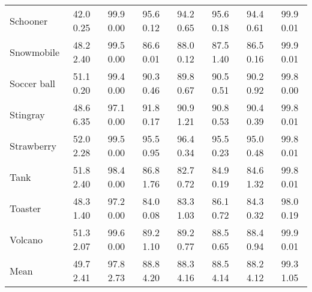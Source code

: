 \documentclass[10pt]{article} \usepackage[accepted]{stylefiles/tmlr}
\begin{document}
\begin{table*}[th]
\begin{tabular}{lccccccc}
Schooner & 42.0  0.25 & \multicolumn{1}{c|}{99.9  0.00} & 95.6  0.12 & \multicolumn{1}{c|}{94.2  0.65} & 95.6  0.18 & 94.4  0.61 & \multicolumn{1}{c}{99.9  0.01} \\
Snowmobile & 48.2  2.40 & \multicolumn{1}{c|}{99.5  0.00} & 86.6  0.01 & \multicolumn{1}{c|}{88.0  0.12} & 87.5  1.40 & 86.5  0.16 & \multicolumn{1}{c}{99.9  0.01} \\
Soccer ball & 51.1  0.20 & \multicolumn{1}{c|}{99.4  0.00} & 90.3  0.46 & \multicolumn{1}{c|}{89.8  0.67} & 90.5  0.51 & 90.2  0.92 & \multicolumn{1}{c}{99.8  0.00} \\
Stingray & 48.6  6.35 & \multicolumn{1}{c|}{97.1  0.00} & 91.8  0.17 & \multicolumn{1}{c|}{90.9  1.21} & 90.8  0.53 & 90.4  0.39 & \multicolumn{1}{c}{99.8  0.01} \\
Strawberry & 52.0  2.28 & \multicolumn{1}{c|}{99.5  0.00} & 95.5  0.95 & \multicolumn{1}{c|}{96.4  0.34} & 95.5  0.23 & 95.0  0.48 & \multicolumn{1}{c}{99.8  0.01} \\
Tank & 51.8  2.40 & \multicolumn{1}{c|}{98.4  0.00} & 86.8  1.76 & \multicolumn{1}{c|}{82.7  0.72} & 84.9  0.19 & 84.6  1.32 & \multicolumn{1}{c}{99.8  0.01} \\
Toaster & 48.3  1.40 & \multicolumn{1}{c|}{97.2  0.00} & 84.0  0.08 & \multicolumn{1}{c|}{83.3  1.03} & 86.1  0.72 & 84.3  0.32 & \multicolumn{1}{c}{98.0  0.19} \\
Volcano & 51.3  2.07 & \multicolumn{1}{c|}{99.6  0.00} & 89.2  1.10 & \multicolumn{1}{c|}{89.2  0.77} & 88.5  0.65 & 88.4  0.94 & \multicolumn{1}{c}{99.9  0.01} \\
\midrule
Mean & 49.7  2.41 & \multicolumn{1}{c|}{97.8  2.73} & 88.8  4.20 & \multicolumn{1}{c|}{88.3  4.16} & 88.5  4.14 & 88.2  4.12 & \multicolumn{1}{c}{99.3  1.05} \\
\bottomrule
\end{tabular}
     \end{table*}
\end{document}
